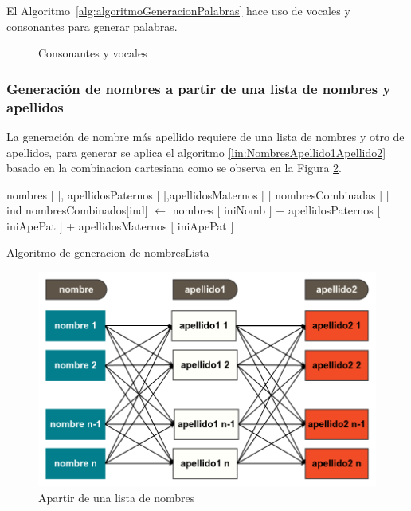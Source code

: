 El Algoritmo~\ref{alg:algoritmoGeneracionPalabras} hace uso de vocales y consonantes para generar palabras.
\begin{figure}[H]
\centering
{}
\caption{Consonantes y vocales} \label{fig:consonantes y vocales}
\end{figure}
\subsubsection{Generaci\'on de nombres a partir de una lista de nombres y apellidos}
La generaci\'on de nombre m\'as apellido requiere de una lista de nombres y otro de apellidos, para generar se aplica el algoritmo \ref{lin:NombresApellido1Apellido2} basado en la combinacion cartesiana como se observa en la Figura  \ref{fig:listNameLastName}.
\begin{algorithm}[H]
\begin{algorithmic}[1]
\REQUIRE nombres $[$ $]$, apellidosPaternos $[$ $]$,apellidosMaternos $[$ $]$ \label{lin:NombresApellido1Apellido2}
\STATE nombresCombinadas $[$ $]$
\STATE ind
\STATE nombresCombinados$[$ind$]$ $\leftarrow$ nombres $[$ iniNomb $]$ + apellidosPaternos $[$ iniApePat $]$ + apellidosMaternos $[$ iniApePat $]$
\ENDFOR
\ENDFOR 
\ENDFOR
\RETURN \TRUE
\end{algorithmic}
\caption{Algoritmo de generacion de nombresLista}\label{alg:algoritmoRaro}
\end{algorithm}

\begin{figure}[H]
\centering
\includegraphics[scale=0.4]{images/listNameApe1Ape2.png}
\caption{Apartir de una lista de nombres}\label{fig:listNameLastName}
\end{figure}

